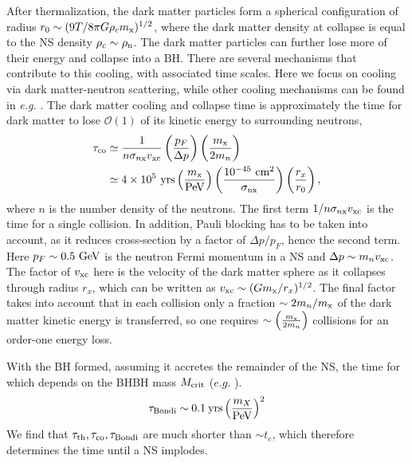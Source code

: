 \documentclass[nofootinbib,longbibliography,prd,floatfix,superscriptaddress,twocolumn]{revtex4-1}
\begin{document}
After thermalization, the dark matter particles form a spherical configuration of radius $r_0\sim (9T/8\pi G \rho_c m_{\rm x})^{1/2}$, where the dark matter density at collapse is equal to the NS density $\rho_c \sim \rho_{\rm n}$.
The dark matter particles can further lose more of their energy and collapse into a BH. There are several mechanisms that contribute to this cooling, with associated time scales. Here we focus on cooling via dark matter-neutron scattering, while other cooling mechanisms can be found in {\em e.g.} \cite{Goldman:1989nd}. The dark matter cooling and collapse time is approximately the time for dark matter to lose $\mathcal{O}(1)$ of its kinetic energy to surrounding neutrons,
\begin{align}
\tau_{\rm co} & \simeq \frac{1}{n \sigma_{n \rm x}v_{\rm xc}} \left(\frac{p_F}{\Delta p}\right) \left(\frac{m_{\rm x}}{2 m_n}\right)\label{eq:tau_co}
\nonumber \\
&\simeq 4 \times 10^5~ {\rm yrs} \left(\frac{m_{\rm x}}{{\rm PeV}}\right)\left(\frac{10^{-45}~\rm cm^2}{\sigma_{\rm n  x}}\right) \left(\frac{r_x}{r_0}\right),
\end{align}
where $n$ is the number density of the neutrons.
The first term $1/n \sigma_{n \rm x} v_{\rm xc}$ is the time for a single collision. In addition, Pauli blocking has to be taken into account, as it reduces cross-section by a factor of $\Delta p /p_F$, hence the second term. Here $p_F\sim 0.5~ {\rm GeV}$ is the neutron Fermi momentum in a NS and $\Delta p\sim m_n v_{\rm xc}$. The factor of $v_{\rm xc}$ here is the velocity of the dark matter sphere as it collapses through radius $r_x$, which can be written as $v_{\rm xc}\sim (G m_{\rm x}/r_{x})^{1/2}$. 
The final factor takes into account that in each collision only a fraction $\sim 2 m_n / m_{\rm x}$ of the dark matter kinetic energy is transferred, so one requires $\sim\left(\frac{m_{\rm x}}{2 m_n}\right)$ collisions for an order-one energy loss. 

With the BH formed, assuming it accretes the remainder of the NS, the time for which depends on the BHBH mass $M_{\rm crit}$ ($e.g.$ \cite{Bramante:2016mzo,Kouvaris:2013kra}). 
\begin{align}
\tau_{\rm Bondi} \sim 0.1 {\rm\:yrs} \left(\frac{m_X}{\rm PeV}\right)^2 %
\end{align}%
We find that $\tau_{\rm th},\tau_{\rm co}, \tau_{\rm Bondi}$ are much shorter than $\sim t_c$, which therefore determines the time until a NS implodes.



\end{document}
